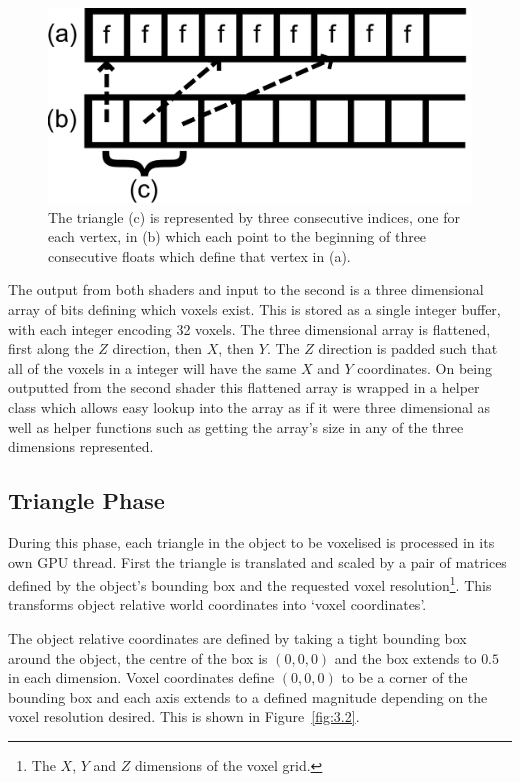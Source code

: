 \begin{figure}
\centerline{\includegraphics[scale=0.5]{buffers13.pdf}}
\caption{The triangle (c) is represented by three consecutive indices, one for each vertex, in (b) which each point to the beginning of three consecutive floats which define that vertex in (a).}
\label{fig:3.1}
\end{figure}

The output from both shaders and input to the second is a three dimensional array of bits defining which voxels exist. This is stored as a single integer buffer, with each integer encoding 32 voxels. The three dimensional array is flattened, first along the $Z$ direction, then $X$, then $Y$. The $Z$ direction is padded such that all of the voxels in a integer will have the same $X$ and $Y$ coordinates. On being outputted from the second shader this flattened array is wrapped in a helper class which allows easy lookup into the array as if it were three dimensional as well as helper functions such as getting the array's size in any of the three dimensions represented.


\subsection{Triangle Phase}

During this phase, each triangle in the object to be voxelised is processed in its own GPU thread. First the triangle is translated and scaled by a pair of matrices defined by the object's bounding box and the requested voxel resolution\footnote{The $X$, $Y$ and $Z$ dimensions of the voxel grid.}. This transforms object relative world coordinates into `voxel coordinates'. 

The object relative coordinates are defined by taking a tight bounding box around the object, the centre of the box is $(0,0,0)$ and the box extends to $0.5$ in each dimension. Voxel coordinates define $(0,0,0)$ to be a corner of the bounding box and each axis extends to a defined magnitude depending on the voxel resolution desired. This is shown in Figure~\ref{fig:3.2}.

